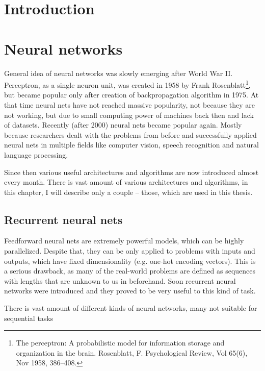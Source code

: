 
\chapter{Introduction}

\chapter{Neural networks} 
General idea of neural networks was slowly emerging after World War II. Perceptron, as a single neuron unit, was created in 1958 by Frank Rosenblatt\footnote{The perceptron: A probabilistic model for information storage and organization in the brain. Rosenblatt, F. Psychological Review, Vol 65(6), Nov 1958, 386--408.}, but became popular only after creation of backpropagation algorithm in 1975. At that time neural nets have not reached massive popularity, not because they are not working, but due to small computing power of machines back then and lack of datasets. Recently (after 2000) neural nets became popular again. Mostly because researchers dealt with the problems from before and successfully applied neural nets in multiple fields like computer vision, speech recognition and natural language processing.

Since then various useful architectures and algorithms are now introduced almost every month. There is vast amount of various architectures and algorithms, in this chapter, I will describe only a couple -- those, which are used in this thesis.

	\section{Recurrent neural nets}
Feedforward neural nets are extremely powerful models, which can be highly parallelized. Despite that, they can be only applied to problems with inputs and outputs, which have fixed dimensionality (e.g. one-hot encoding vectors). This is a serious drawback, as many of the real-world problems are defined as sequences with lengths that are unknown to us in beforehand. Soon recurrent neural networks were introduced and they proved to be very useful to this kind of task.

There is vast amount of different kinds of neural networks, many not suitable for sequential tasks

